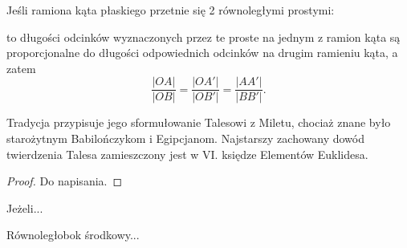 \begin{theorem}[Talesa]
    Jeśli ramiona kąta płaskiego przetnie się 2 równoległymi prostymi:
    \begin{center}
        \end{center}
    to długości odcinków wyznaczonych przez te proste na jednym z ramion kąta są proporcjonalne do długości odpowiednich odcinków na drugim ramieniu kąta, a zatem
    \begin{equation}
        \frac{|OA|}{|OB|} = \frac{|OA'|}{|OB'|} = \frac{|AA'|}{|BB'|}.
    \end{equation}
\end{theorem}

Tradycja przypisuje jego sformułowanie Talesowi z Miletu, chociaż znane było starożytnym Babilończykom i Egipcjanom.
%
Najstarszy zachowany dowód twierdzenia Talesa zamieszczony jest w VI. księdze Elementów Euklidesa. 

\begin{proof}
    Do napisania.
\end{proof}

\begin{proposition}
	Jeżeli...
\end{proposition}

\begin{theorem}[Varignona]
	Równoległobok środkowy...
\end{theorem}


